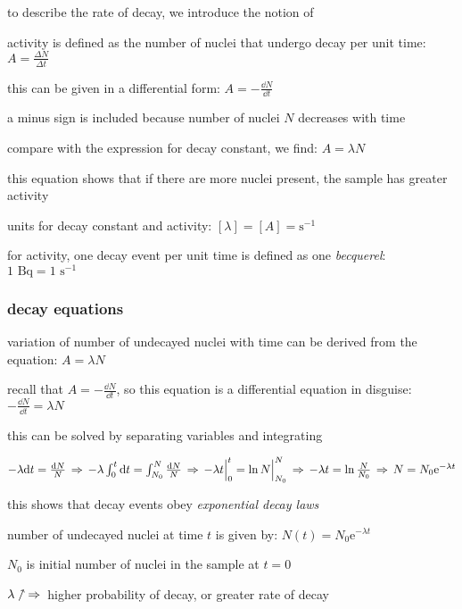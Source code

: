 \cmt to describe the rate of decay, we introduce the notion of 

activity is defined as the number of nuclei that undergo decay per unit time: $\boxed{A=\frac{\Delta N}{\Delta t}}$

this can be given in a differential form: $A = - \frac{\dd N}{\dd t}$

a minus sign is included because number of nuclei $N$ decreases with time

\cmt compare with the expression for decay constant, we find: $\boxed{A=\lambda N}$

this equation shows that if there are more nuclei present, the sample has greater activity

\cmt units for decay constant and activity: $[\lambda] = [A] = \text{s}^{-1}$

for activity, one decay event per unit time is defined as one \emph{becquerel}: $1 \text{ Bq} = 1 \text{ s}^{-1}$



\subsubsection{decay equations}

variation of number of undecayed nuclei with time can be derived from the equation: $A=\lambda N$

recall that $A = - \frac{\dd N}{\dd t}$, so this equation is a differential equation in disguise: $- \frac{\dd N}{\dd t} = \lambda N$

this can be solved by separating variables and integrating

{

\centering

$- \lambda \mathrm{d} t = \frac{\mathrm{d} N}{N} \, \Rightarrow \,
- \lambda \int_0^t \mathrm{d} t = \int_{N_0}^{N} \frac{\mathrm{d} N}{N} \, \Rightarrow \,
- \lambda t \Big|_{0}^{t}= \ln N \Big|_{N_0}^{N} \, \Rightarrow \,
- \lambda t = \ln \frac{N}{N_0} \, \Rightarrow \,
N = N_0 \mathrm{e}^{- \lambda t}$

}

this shows that decay events obey \emph{exponential decay laws}

\cmt number of undecayed nuclei at time $t$ is given by: $\boxed{N(t)=N_0 \mathrm{e}^{- \lambda t}}$

$N_0$ is initial number of nuclei in the sample at $t=0$

\cmt $\lambda \nnearrow \, \Rightarrow \,$ higher probability of decay, or greater rate of decay

